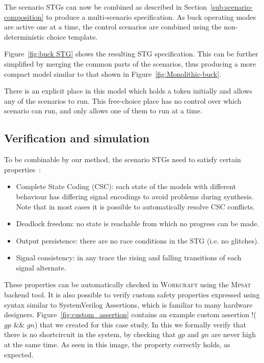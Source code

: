 \documentclass[british, journal]{IEEEtran}
\newcommand{\noun}[1]{\textsc{#1}}
\begin{document}
The scenario STGs can now be combined as described in Section~\ref{sub:scenario-composition}
to produce a multi-scenario specification. As buck operating modes are active one at a
time, the control scenarios are combined using the non-deterministic choice template.

Figure~\ref{fig:buck STG} shows the resulting STG specification. This can be
further simplified by merging the common parts of the scenarios, thus producing
a more compact model similar to that shown in Figure~\ref{fig:Monolithic-buck}.

There is an explicit place in this model which holds a token initially
and allows any of the scenarios to run. This free-choice place has no
control over which scenario can run, and only allows one of
them to run at a time.


\subsection{Verification and simulation}

To be combinable by our method, the scenario STGs need to satisfy certain
properties~\cite{Cortadella}:
\begin{itemize}
\item Complete State Coding (CSC): each state of the models with different
behaviour has differing signal encodings to avoid problems during
synthesis. Note that in most cases it is possible to automatically
resolve CSC conflicts.
\item Deadlock freedom: no state is reachable from which no progress can
be made.
\item Output persistence: there are no race conditions in the STG (i.e. no glitches).
\item Signal consistency: in any trace the rising and falling transitions of
each signal alternate.
\end{itemize}
These properties can be automatically checked in \noun{Workcraft} using
the \noun{Mpsat}~\cite{khomenko2004detecting} backend tool.
It is also possible to verify custom safety properties expressed using
syntax similar to SystemVerilog Assertions, which is familiar to many
hardware designers.
Figure~\ref{fig:custom_assertion} contains an example custom assertion
\textsf{!($gp$ \&\& $gn$)} that we created for this case study.
In this we formally verify that there is no shortcircuit in the system, by
checking that $gp$ and $gn$ are never high at the same time.
As seen in this image, the property correctly holds, as expected.
\end{document}
